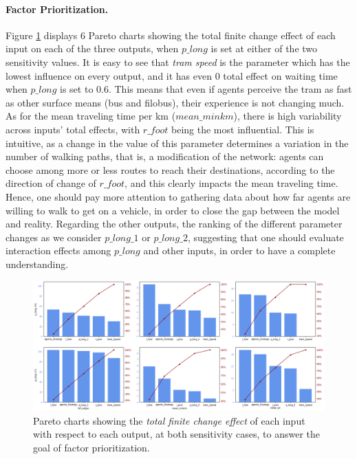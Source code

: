 \paragraph{Factor Prioritization.}
Figure \ref{fig:factor_prior} displays 6 Pareto charts showing the total finite change effect of each input on each of the three outputs, when $p\_long$ is set at either of the two sensitivity values. It is easy to see that \textit{tram speed} is the parameter which has the lowest influence on every output, and it has even 0 total effect on waiting time when $p\_long$ is set to 0.6. This means that even if agents perceive the tram as fast as other surface means (bus and filobus), their experience is not changing much. As for the mean traveling time per km ($mean\_minkm$), there is high variability across inputs' total effects, with $r\_foot$ being the most influential. This is intuitive, as a change in the value of this parameter determines a variation in the number of walking paths, that is, a modification of the network: agents can choose among more or less routes to reach their destinations, according to the direction of change of $r\_foot$, and this clearly impacts the mean traveling time. Hence, one should pay more attention to gathering data about how far agents are willing to walk to get on a vehicle, in order to close the gap between the model and reality. 
Regarding the other outputs, the ranking of the different parameter changes as we consider $p\_long\_1$ or $p\_long\_2$, suggesting that one should evaluate interaction effects among $p\_long$ and other inputs, in order to have a complete understanding.

\begin{landscape}
\centering
\hspace{10cm}
\begin{figure}[h]
    \centering
    \includegraphics[width = \hsize]{tex/pics/pareto_fp.png}
    \caption{Pareto charts showing the \textit{total finite change effect} of each input with respect to each output, at both sensitivity cases, to answer the goal of factor prioritization.}
    \label{fig:factor_prior}
\end{figure}
\end{landscape}


